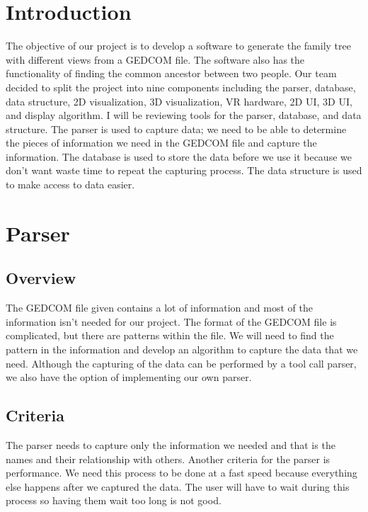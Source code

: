 \documentclass[onecolumn, draftclsnofoot, 10pt, compsoc]{IEEEtran}
\begin{document}
\section{Introduction}
The objective of our project is to develop a software to generate the family tree with different views from a GEDCOM file. The software also has the functionality of finding the common ancestor between two people. Our team decided to split the project into nine components including the parser, database, data structure, 2D visualization, 3D visualization, VR hardware, 2D UI, 3D UI, and display algorithm. I will be reviewing tools for the parser, database, and data structure. The parser is used to capture data; we need to be able to determine the pieces of information we need in the GEDCOM file and capture the information. The database is used to store the data before we use it because we don't want waste time to repeat the capturing process. The data structure is used to make access to data easier.

\section{Parser}
\subsection{Overview}
\begin{singlespace}
The GEDCOM file given contains a lot of information and most of the information isn't needed for our project. The format of the GEDCOM file is complicated, but there are patterns within the file. We will need to find the pattern in the information and develop an algorithm to capture the data that we need. Although the capturing of the data can be performed by a tool call parser, we also have the option of implementing our own parser.
\end{singlespace}

\subsection{Criteria}
\begin{singlespace}
The parser needs to capture only the information we needed and that is the names and their relationship with others. Another criteria for the parser is performance. We need this process to be done at a fast speed because everything else happens after we captured the data. The user will have to wait during this process so having them wait too long is not good.
\end{singlespace}
\end{document}
